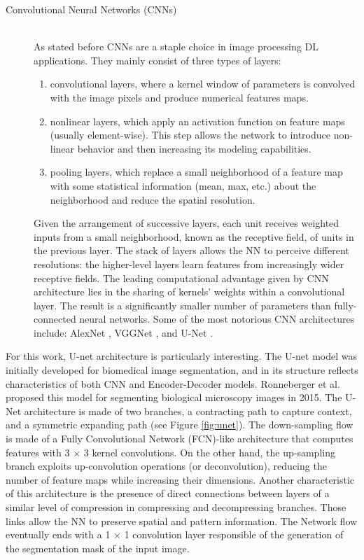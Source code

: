 \begin{description}
    \item [Convolutional Neural Networks (CNNs)] \hfill \\
        As stated before CNNs are a staple choice in image processing DL applications. They mainly consist of three types of layers:

        \begin{enumerate}[i]
            \item convolutional layers, where a kernel window of parameters is convolved with the image pixels and produce numerical features maps.

            \item nonlinear layers, which apply an activation function on feature maps (usually element-wise). This step allows the network to introduce non-linear behavior and then increasing its modeling capabilities.

            \item pooling layers, which replace a small neighborhood of a feature map with some statistical information (mean, max, etc.) about the neighborhood and reduce the spatial resolution.
        \end{enumerate}

        Given the arrangement of successive layers, each unit receives weighted inputs from a small neighborhood, known as the receptive field, of units in the previous layer. The stack of layers allows the NN to perceive different resolutions: the higher-level layers learn features from increasingly wider receptive fields. The leading computational advantage given by CNN architecture lies in the sharing of kernels' weights within a convolutional layer. The result is a significantly smaller number of parameters than fully-connected neural networks. Some of the most notorious CNN architectures include: AlexNet \cite{AlexNet}, VGGNet \cite{1409.1556}, and U-Net \cite{U-net}.
\end{description}

For this work, U-net architecture is particularly interesting. The U-net model was initially developed for biomedical image segmentation, and in its structure reflects characteristics of both CNN and Encoder-Decoder models. Ronneberger et al.\cite{U-net} proposed this model for segmenting biological microscopy images in 2015. The U-Net architecture is made of two branches, a contracting path to capture context, and a symmetric expanding path (see Figure \ref{fig:unet}). The down-sampling flow is made of a Fully Convolutional Network (FCN)-like architecture that computes features with 3 $\times$ 3 kernel convolutions. On the other hand, the up-sampling branch exploits up-convolution operations (or deconvolution), reducing the number of feature maps while increasing their dimensions. Another characteristic of this architecture is the presence of direct connections between layers of a similar level of compression in compressing and decompressing branches. Those links allow the NN to preserve spatial and pattern information. The Network flow eventually ends with a 1 $\times$ 1 convolution layer responsible of the generation of the segmentation mask of the input image.

